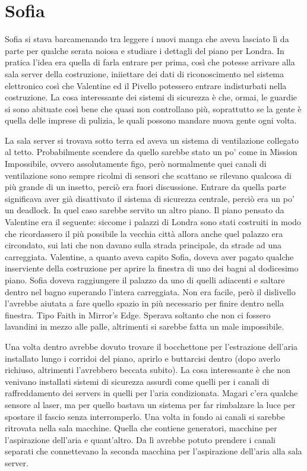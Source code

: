   \section*{Sofia}

    Sofia si stava barcamenando tra leggere i nuovi manga che aveva lasciato lì da parte per qualche serata noiosa e
    studiare i dettagli del piano per Londra. In pratica l'idea era quella di farla entrare per prima, così che potesse
    arrivare alla sala server della costruzione, iniiettare dei dati di riconoscimento nel sistema elettronico così che
    Valentine ed il Pivello potessero entrare indisturbati nella costruzione. La cosa interessante dei sistemi di
    sicurezza è che, ormai, le guardie si sono abituate così bene che quasi non controllano più, soprattutto se la gente
    è quella delle imprese di pulizia, le quali possono mandare nuova gente ogni volta.

    La sala server si trovava sotto terra ed aveva un sistema di ventilazione collegato al tetto. Probabilmente scendere
    da quello sarebbe stato un po' come in Mission Impossibile, ovvero assolutamente figo, però normalmente quei canali
    di ventilazione sono sempre ricolmi di sensori che scattano se rilevano qualcosa di più grande di un insetto, perciò
    era fuori discussione. Entrare da quella parte significava aver già disattivato il sistema di sicurezza centrale,
    perciò era un po' un deadlock. In quel caso sarebbe servito un altro piano. Il piano pensato da Valentine era il
    seguente: siccome i palazzi di Londra sono stati costruiti in modo che ricordassero il più possibile la vecchia
    città allora anche quel palazzo era circondato, sui lati che non davano sulla strada principale, da strade ad una
    carreggiata. Valentine, a quanto aveva capito Sofia, doveva aver pagato qualche inserviente della costruzione per
    aprire la finestra di uno dei bagni al dodicesimo piano. Sofia doveva raggiungere il palazzo da uno di quelli
    adiacenti e saltare dentro nel bagno superando l'intera carreggiata. Non era facile, però il dislivello l'avrebbe
    aiutata a fare quello spazio in più necessario per finire dentro nella finestra. Tipo Faith in Mirror's Edge.
    Sperava soltanto che non ci fossero lavandini in mezzo alle palle, altrimenti si sarebbe fatta un male impossibile.

    Una volta dentro avrebbe dovuto trovare il bocchettone per l'estrazione dell'aria installato lungo i corridoi del
    piano, aprirlo e buttarcisi dentro (dopo averlo richiuso, altrimenti l'avrebbero beccata subito). La cosa
    interessante è che non venivano installati sistemi di sicurezza assurdi come quelli per i canali di raffreddamento
    dei servers in quelli per l'aria condizionata. Magari c'era qualche sensore al laser, ma per quello bastava un
    sistema per far rimbalzare la luce per spostare il fascio senza interromperlo. Una volta in fondo ai canali si
    sarebbe ritrovata nella sala macchine. Quella che contiene generatori, macchine per l'aspirazione dell'aria e
    quant'altro. Da lì avrebbe potuto prendere i canali separati che connettevano la seconda macchina per l'aspirazione
    dell'aria alla sala server.

